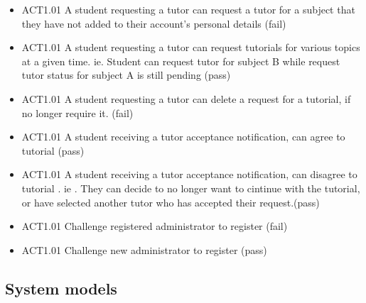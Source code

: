 \documentclass[12pt]{article}
\begin{document}
\begin{itemize}
\item ACT1.01	A student requesting a tutor can request a tutor for a subject that they have not added to their account's personal details  (fail)
\item ACT1.01	A student requesting a tutor can request tutorials for various topics at a given time. ie. Student can request tutor for subject B while request tutor status for subject A is still pending (pass)	
\item ACT1.01	A student requesting a tutor can delete a request for a  tutorial, if no longer require it. (fail)
\item ACT1.01	A student receiving a tutor acceptance notification, can agree to tutorial (pass)
\item ACT1.01	A student receiving a tutor acceptance notification, can disagree to tutorial . ie . They can decide to no longer want to cintinue with the tutorial, or have selected another tutor who has accepted their request.(pass)			

\item ACT1.01	Challenge registered administrator to register (fail)
\item ACT1.01	Challenge new administrator to register (pass)
\end{itemize}


\subsection{System models}
\end{document}
